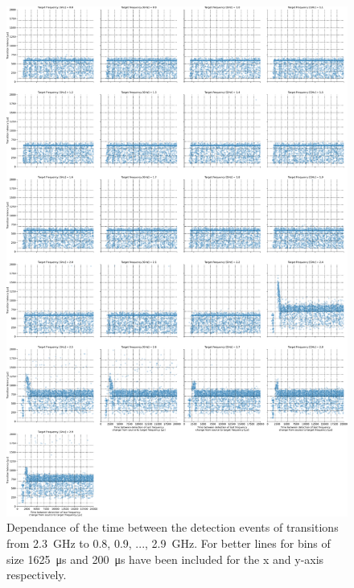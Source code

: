 \begin{figure}[]
    \centering
    \includegraphics[width=\columnwidth]{fig/ftalat_scatter_wait_transition_latency_hati_source_2.3.pdf}
    \caption{Dependance of the time between the detection events of transitions from \SI{2.3}{\GHz} to \SI{0.8}{}, \SI{0.9}{}, ..., \SI{2.9}{\GHz}. For better lines for bins of size \SI{1625}{\us} and \SI{200}{\us} have been included for the x and y-axis respectively.}
\end{figure}
